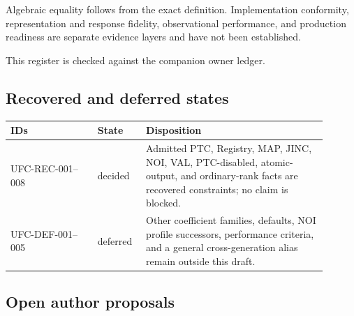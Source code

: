 Algebraic equality follows from the exact definition. Implementation
conformity, representation and response fidelity, observational performance,
and production readiness are separate evidence layers and have not been
established.

This register is checked against the companion owner ledger.

\subsection*{Recovered and deferred states}

\begin{center}
\begin{tabular}{p{0.25\linewidth}p{0.13\linewidth}p{0.52\linewidth}}
\toprule
IDs & State & Disposition\\
\midrule
UFC-REC-001--008 & decided & Admitted PTC, Registry, MAP, JINC, NOI, VAL,
PTC-disabled, atomic-output, and ordinary-rank facts are recovered
constraints; no claim is blocked.\\
UFC-DEF-001--005 & deferred & Other coefficient families, defaults, NOI
profile successors, performance criteria, and a general cross-generation
alias remain outside this draft.\\
\bottomrule
\end{tabular}
\end{center}

\subsection*{Open author proposals}

